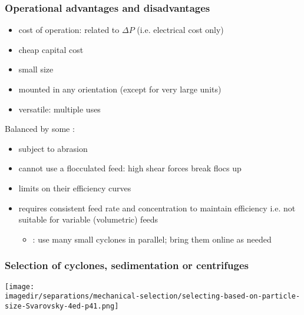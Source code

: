 \begin{frame}\frametitle{Operational advantages and disadvantages}
	{\color{myGreen}{Advantages}}
	\begin{itemize}
		\item	cost of operation: related to $\Delta P$ (i.e. electrical cost only)
		\item	cheap capital cost
		\item	small size
		\item	mounted in any orientation (except for very large units)
		\item	versatile: multiple uses
	\end{itemize}

	Balanced by some {\color{myOrange}{disadvantages}}:
	\begin{itemize}
		\item	subject to abrasion
		\item	cannot use a flocculated feed: high shear forces break flocs up
		\item	limits on their efficiency curves
		\item	requires consistent feed rate and concentration to maintain efficiency i.e. not suitable for variable (volumetric) feeds
		\begin{itemize}
			\item	{\color{myBlue}{counteract}}: use many small cyclones in parallel; bring them online as needed
		\end{itemize}
	\end{itemize}
\end{frame}

\begin{frame}\frametitle{Selection of cyclones, sedimentation or centrifuges}
	\begin{center}
		\texttt{[image: \\imagedir/separations/mechanical-selection/selecting-based-on-particle-size-Svarovsky-4ed-p41.png]}
	\end{center}
\end{frame}

